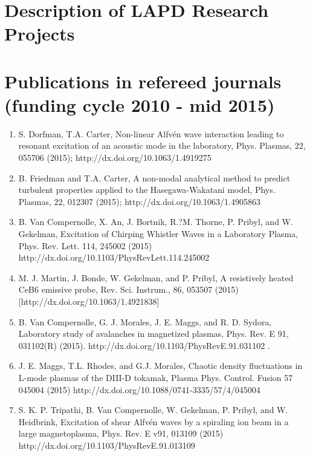 \documentclass[11pt]{article}
\begin{document}
\section{Description of LAPD Research Projects}




\section{Publications in refereed journals (funding cycle 2010 - mid 2015)}
 \begin{enumerate}

\item S. Dorfman, T.A. Carter, Non-linear Alfv\'{e}n wave interaction
  leading to resonant excitation of an acoustic mode in the
  laboratory, Phys. Plasmas, 22, 055706 (2015);
  http://dx.doi.org/10.1063/1.4919275

\item B. Friedman and T.A. Carter, A non-modal analytical method to
  predict turbulent properties applied to the Hasegawa-Wakatani model,
  Phys. Plasmas, 22, 012307 (2015); http://dx.doi.org/10.1063/1.4905863

\item B. Van Compernolle, X. An, J. Bortnik, R.?M. Thorne, P. Pribyl, and W. Gekelman, Excitation of Chirping Whistler Waves in a Laboratory Plasma, Phys. Rev. Lett. 114, 245002 (2015) http://dx.doi.org/10.1103/PhysRevLett.114.245002

\item M. J. Martin, J. Bonde, W. Gekelman, and P. Pribyl, A resistively heated CeB6 emissive probe, Rev. Sci. Instrum., 86, 053507 (2015) [http://dx.doi.org/10.1063/1.4921838]

\item B. Van Compernolle, G. J. Morales, J. E. Maggs, and R. D. Sydora, Laboratory study of avalanches in magnetized plasmas, Phys. Rev. E 91, 031102(R) (2015). http://dx.doi.org/10.1103/PhysRevE.91.031102 .

\item J. E. Maggs, T.L. Rhodes, and G.J. Morales, Chaotic density fluctuations in L-mode plasmas of the DIII-D tokamak, Plasma Phys. Control. Fusion 57 045004 (2015) http://dx.doi.org/10.1088/0741-3335/57/4/045004

\item S. K. P. Tripathi, B. Van Compernolle, W. Gekelman, P. Pribyl, and W. Heidbrink, Excitation of shear Alfv\'{e}n waves by a spiraling ion beam in a large magnetoplasma, Phys. Rev. E v91, 013109 (2015) http://dx.doi.org/10.1103/PhysRevE.91.013109


\end{enumerate}
\end{document}
